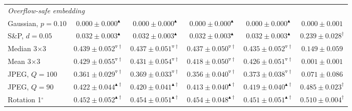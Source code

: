 \begin{table}[t]
\begin{tabular}{lccccc}
\midrule
\multicolumn{6}{l}{\emph{Overflow-safe embedding}} \\
Gaussian, $p=0.10$ & $\mathbf{0.000 \pm 0.000}^{\blacktriangle}$ & $0.000 \pm 0.000^{\blacktriangle}$ & $0.000 \pm 0.000^{\blacktriangle}$ & $0.000 \pm 0.000^{\blacktriangle}$ & $0.000 \pm 0.001$ \\
S\&P, $d=0.05$ & $0.032 \pm 0.003^{\blacktriangle}$ & $0.032 \pm 0.003^{\blacktriangle}$ & $0.032 \pm 0.003^{\blacktriangle}$ & $\mathbf{0.032 \pm 0.003}^{\blacktriangle}$ & $0.239 \pm 0.028^{\dagger}$ \\
Median 3$\times$3 & $0.439 \pm 0.052^{\triangledown\dagger}$ & $0.437 \pm 0.051^{\triangledown\dagger}$ & $0.437 \pm 0.050^{\triangledown\dagger}$ & $0.435 \pm 0.052^{\triangledown\dagger}$ & $\mathbf{0.149 \pm 0.059}$ \\
Mean 3$\times$3 & $0.429 \pm 0.055^{\triangledown\dagger}$ & $0.431 \pm 0.054^{\triangledown\dagger}$ & $0.418 \pm 0.050^{\triangledown\dagger}$ & $0.426 \pm 0.051^{\triangledown\dagger}$ & $\mathbf{0.001 \pm 0.001}$ \\
JPEG, $Q=100$ & $0.361 \pm 0.029^{\triangledown\dagger}$ & $0.369 \pm 0.033^{\triangledown\dagger}$ & $0.356 \pm 0.040^{\triangledown\dagger}$ & $0.373 \pm 0.038^{\triangledown\dagger}$ & $\mathbf{0.071 \pm 0.086}$ \\
JPEG, $Q=90$ & $0.422 \pm 0.044^{\blacktriangle\dagger}$ & $0.420 \pm 0.041^{\blacktriangle\dagger}$ & $\mathbf{0.413 \pm 0.040}^{\blacktriangle\dagger}$ & $0.419 \pm 0.040^{\blacktriangle\dagger}$ & $0.485 \pm 0.023^{\dagger}$ \\
Rotation 1$^\circ$ & $0.452 \pm 0.052^{\blacktriangle\dagger}$ & $0.454 \pm 0.051^{\blacktriangle\dagger}$ & $0.454 \pm 0.048^{\blacktriangle\dagger}$ & $\mathbf{0.451 \pm 0.051}^{\blacktriangle\dagger}$ & $0.510 \pm 0.004^{\dagger}$ \\
\bottomrule
\end{tabular}
\end{table}

